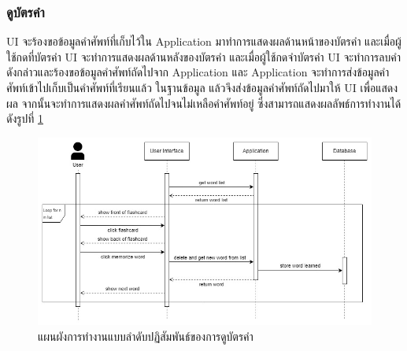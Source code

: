 \documentclass[12pt,oneside,openright,a4paper]{cpe-thai-project}
\begin{document}
\pagebreak
\subsubsection{ดูบัตรคำ}
\hspace{1cm}
UI จะร้องขอข้อมูลคำศัพท์ที่เก็บไว้ใน Application มาทำการแสดงผลด้านหน้าของบัตรคำ และเมื่อผู้ใช้กดที่บัตรคำ UI จะทำการแสดงผลด้านหลังของบัตรคำ
และเมื่อผู้ใช้กดจำบัตรคำ UI จะทำการลบคำดังกล่าวและร้องขอข้อมูลคำศัพท์ถัดไปจาก Application และ Application จะทำการส่งข้อมูลคำศัพท์เข้าไปเก็บเป็นคำศัพท์ที่เรียนแล้ว
ในฐานข้อมูล แล้วจึงส่งข้อมูลคำศัพท์ถัดไปมาให้ UI เพื่อแสดงผล จากนั้นจะทำการแสดงผลคำศัพท์ถัดไปจนไม่เหลือคำศัพท์อยู่ ซึ่งสามารถแสดงผลลัพธ์การทำงานได้ดังรูปที่ \ref{fig:S_Flashcard}
\begin{figure}[!h]\centering
	\includegraphics[width=\textwidth, keepaspectratio=true]{image/chap3/sequence/Flashcard.jpg}
	\caption{แผนผังการทำงานแบบลำดับปฏิสัมพันธ์ของการดูบัตรคำ}\label{fig:S_Flashcard}
\end{figure}

\pagebreak
\end{document}
